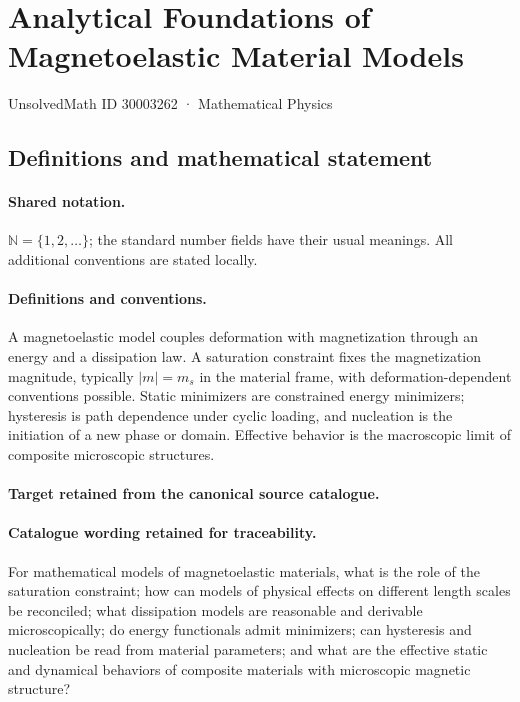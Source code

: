 \documentclass[11pt]{article}
\begin{document}
\setcounter{section}{30003261}
\section{Analytical Foundations of Magnetoelastic Material Models}\label{30003262}
{\small UnsolvedMath ID 30003262 · Mathematical Physics}
\subsection{Definitions and mathematical statement}

\paragraph{Shared notation.}$\mathbb N=\{1,2,\ldots\}$; the standard number fields have their usual meanings. All additional conventions are stated locally.


\paragraph{Definitions and conventions.}
A magnetoelastic model couples deformation with magnetization through an energy and a dissipation law. A saturation constraint fixes the magnetization magnitude, typically $|m|=m_s$ in the material frame, with deformation-dependent conventions possible. Static minimizers are constrained energy minimizers; hysteresis is path dependence under cyclic loading, and nucleation is the initiation of a new phase or domain. Effective behavior is the macroscopic limit of composite microscopic structures.

\paragraph{Target retained from the canonical source catalogue.}
\paragraph{Catalogue wording retained for traceability.}
For mathematical models of magnetoelastic materials, what is the role of the saturation constraint; how can models of physical effects on different length scales be reconciled; what dissipation models are reasonable and derivable microscopically; do energy functionals admit minimizers; can hysteresis and nucleation be read from material parameters; and what are the effective static and dynamical behaviors of composite materials with microscopic magnetic structure?
\end{document}
